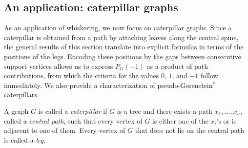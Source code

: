\documentclass[12pt]{amsart}
\theoremstyle{plain}
\theoremstyle{definition}
\begin{document}
\subsection{An application: caterpillar graphs}

As an application of whiskering, we now focus on caterpillar graphs. Since a caterpillar is obtained from a path by attaching leaves along the central spine, the general results of this section translate into explicit formulas in terms of the positions of the legs. Encoding these positions by the gaps between consecutive support vertices allows us to express \(P_G(-1)\) as a product of path contributions, from which the criteria for the values \(0\), \(1\), and \(-1\) follow immediately. We also provide a characterization of pseudo-Gorenstein\(^*\) caterpillars.




\begin{defn}
A graph \(G\) is called a \emph{caterpillar} if \(G\) is a tree and there exists
a path \(x_1,\dots,x_n\), called a \emph{central path}, such that every vertex of
\(G\) is either one of the \(x_i\)'s or is adjacent to one of them. Every vertex
of \(G\) that does not lie on the central path is called a \emph{leg}.
\end{defn}
\end{document}
